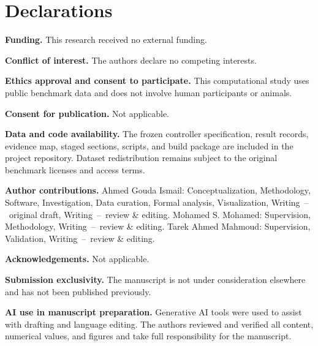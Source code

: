 \documentclass[pdflatex,sn-mathphys-num,iicol]{sn-jnl}
\begin{document}
\maketitle










\backmatter

\section*{Declarations}

\noindent\textbf{Funding.} This research received no external funding.

\noindent\textbf{Conflict of interest.} The authors declare no competing interests.

\noindent\textbf{Ethics approval and consent to participate.} This computational study uses public benchmark data and does not involve human participants or animals.

\noindent\textbf{Consent for publication.} Not applicable.

\noindent\textbf{Data and code availability.} The frozen controller specification, result records, evidence map, staged sections, scripts, and build package are included in the project repository. Dataset redistribution remains subject to the original benchmark licenses and access terms.

\noindent\textbf{Author contributions.} Ahmed Gouda Ismail: Conceptualization, Methodology, Software, Investigation, Data curation, Formal analysis, Visualization, Writing~--~original draft, Writing~--~review \& editing. Mohamed S. Mohamed: Supervision, Methodology, Writing~--~review \& editing. Tarek Ahmed Mahmoud: Supervision, Validation, Writing~--~review \& editing.

\noindent\textbf{Acknowledgements.} Not applicable.

\noindent\textbf{Submission exclusivity.} The manuscript is not under consideration elsewhere and has not been published previously.

\noindent\textbf{AI use in manuscript preparation.} Generative AI tools were used to assist with drafting and language editing. The authors reviewed and verified all content, numerical values, and figures and take full responsibility for the manuscript.


\end{document}
